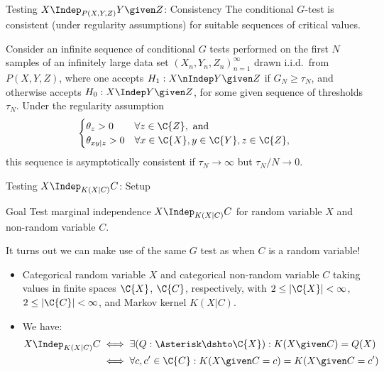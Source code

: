 \begin{frame}{Testing $X \Indep_{P(X,Y,Z)} Y \given Z$: Consistency}
  The conditional $G$-test is consistent (under regularity assumptions) for suitable sequences of critical values.
  \begin{Cor}[\ref{cor:cond_G_test_consistency}]
  Consider an infinite sequence of conditional $G$ tests performed on the first $N$ samples of an infinitely large
  data set $(X_n,Y_n,Z_n)_{n=1}^\infty$ drawn i.i.d.\ from $P(X,Y,Z)$,
  where one accepts $H_1 : X \nIndep Y \given Z$ if $G_N \ge \tau_N$, and otherwise accepts $H_0 : X \Indep Y \given Z$,
  for some given sequence of thresholds $\tau_N$.
  Under the regularity assumption 
\begin{equation*}
  \begin{cases}
    \theta_z > 0 & \forall z \in \C{Z}, \text{ and}\\
    \theta_{xy|z} > 0 & \forall x \in \C{X}, y\in \C{Y}, z\in \C{Z},
  \end{cases}
\end{equation*}
  this sequence is asymptotically consistent if $\tau_N \to \infty$ but $\tau_N / N \to 0$.
  \end{Cor}
\end{frame}


\begin{frame}{Testing $X \Indep_{K(X|C)} C$: Setup}
  \begin{block}{Goal}
    Test marginal independence $X \Indep_{K(X|C)} C$ for random variable $X$ and non-random variable $C$.
  \end{block}

  \bigskip
  It turns out we can make use of the same $G$ test as when $C$ is a random variable!

  \bigskip
  \begin{itemize}
    \item Categorical random variable $X$ and categorical non-random variable $C$ taking values in finite spaces $\C{X}$, $\C{C}$,
respectively, with $2 \le |\C{X}| < \infty$, $2 \le |\C{C}| < \infty$, and Markov kernel $K(X|C)$.
    \item We have:
      \begin{equation*}\begin{split}
        X \Indep_{K(X|C)} C
        & \iff \exists (Q : \Asterisk \dshto \C{X}) : K(X\given C) = Q(X) \\
        & \iff \forall c,c' \in \C{C}: K(X\given C=c) = K(X\given C=c') 
      \end{split}\end{equation*}
  \end{itemize}
\end{frame}

